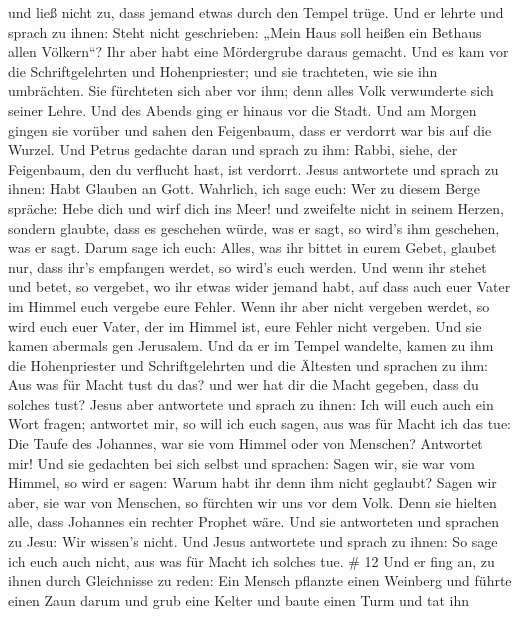  und ließ nicht zu, dass jemand etwas durch den Tempel
trüge.  Und er lehrte und sprach zu ihnen: Steht nicht
geschrieben: „Mein Haus soll heißen ein Bethaus allen Völkern``? Ihr
aber habt eine Mördergrube daraus gemacht.  Und es kam vor
die Schriftgelehrten und Hohenpriester; und sie trachteten, wie sie ihn
umbrächten. Sie fürchteten sich aber vor ihm; denn alles Volk
verwunderte sich seiner Lehre.  Und des Abends ging er
hinaus vor die Stadt.  Und am Morgen gingen sie vorüber und
sahen den Feigenbaum, dass er verdorrt war bis auf die Wurzel.
 Und Petrus gedachte daran und sprach zu ihm: Rabbi, siehe,
der Feigenbaum, den du verflucht hast, ist verdorrt.  Jesus
antwortete und sprach zu ihnen: Habt Glauben an Gott. 
Wahrlich, ich sage euch: Wer zu diesem Berge spräche: Hebe dich und wirf
dich ins Meer! und zweifelte nicht in seinem Herzen, sondern glaubte,
dass es geschehen würde, was er sagt, so wird's ihm geschehen, was er
sagt.  Darum sage ich euch: Alles, was ihr bittet in eurem
Gebet, glaubet nur, dass ihr's empfangen werdet, so wird's euch werden.
 Und wenn ihr stehet und betet, so vergebet, wo ihr etwas
wider jemand habt, auf dass auch euer Vater im Himmel euch vergebe eure
Fehler.  Wenn ihr aber nicht vergeben werdet, so wird euch
euer Vater, der im Himmel ist, eure Fehler nicht vergeben. 
Und sie kamen abermals gen Jerusalem. Und da er im Tempel wandelte,
kamen zu ihm die Hohenpriester und Schriftgelehrten und die Ältesten
 und sprachen zu ihm: Aus was für Macht tust du das? und
wer hat dir die Macht gegeben, dass du solches tust?  Jesus
aber antwortete und sprach zu ihnen: Ich will euch auch ein Wort fragen;
antwortet mir, so will ich euch sagen, aus was für Macht ich das tue:
 Die Taufe des Johannes, war sie vom Himmel oder von
Menschen? Antwortet mir!  Und sie gedachten bei sich selbst
und sprachen: Sagen wir, sie war vom Himmel, so wird er sagen: Warum
habt ihr denn ihm nicht geglaubt?  Sagen wir aber, sie war
von Menschen, so fürchten wir uns vor dem Volk. Denn sie hielten alle,
dass Johannes ein rechter Prophet wäre.  Und sie
antworteten und sprachen zu Jesu: Wir wissen's nicht. Und Jesus
antwortete und sprach zu ihnen: So sage ich euch auch nicht, aus was für
Macht ich solches tue. \# 12  Und er fing an, zu ihnen durch
Gleichnisse zu reden: Ein Mensch pflanzte einen Weinberg und führte
einen Zaun darum und grub eine Kelter und baute einen Turm und tat ihn
